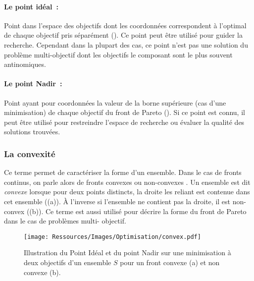 \paragraph{Le point idéal~:} %
\label{par:le_point_idéal}
Point dans l’espace des objectifs dont les coordonnées correspondent à l’optimal
de chaque objectif pris séparément (). Ce point peut
être utilisé pour guider la recherche. Cependant dans la plupart des cas, ce
point n’est pas une solution du problème multi-objectif dont les objectifs le
composant sont le plus souvent antinomiques.

\paragraph{Le point Nadir~:} %
\label{par:le_point_nadir}
Point ayant pour coordonnées la valeur de la borne supérieure (cas d’une
minimisation) de chaque objectif du front de Pareto ().
Si ce point est connu, il peut être utilisé pour restreindre l’espace de
recherche ou évaluer la qualité des solutions trouvées.


\subsubsection{La convexité} %
\label{ssub:la_convexite}
Ce terme permet de caractériser la forme d’un ensemble. Dans le cas de fronts continus,
on parle alors de fronts convexes ou non-convexes \parencite{Collette2002}. Un ensemble
est dit \textit{convexe} lorsque pour deux points distincts, la droite les reliant est
contenue dans cet ensemble ((a)). À l’inverse si l’ensemble ne
contient pas la droite, il est non-convex ((b)). Ce terme est
aussi utilisé pour décrire la forme du front de Pareto dans le cas de problèmes multi-
objectif.

\begin{figure}
    \centering
    \texttt{[image: Ressources/Images/Optimisation/convex.pdf]}
    \caption[Illustration du Point Idéal et du point Nadir]
            {Illustration du Point Idéal et du point Nadir sur une minimisation
             à deux objectifs d’un ensemble $S$ pour un front convexe (a) et non
             convexe (b).}
    \label{fig:convex_nadir}
\end{figure}



